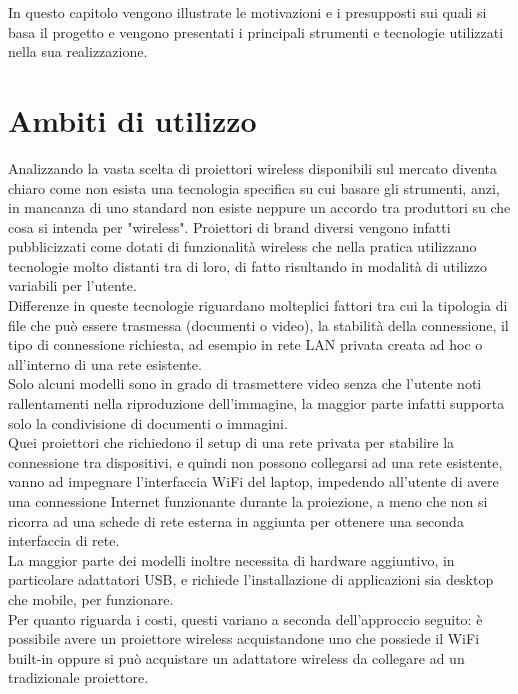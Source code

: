 In questo capitolo vengono illustrate le motivazioni e i presupposti sui quali si basa il progetto e vengono presentati i principali strumenti e tecnologie utilizzati nella sua realizzazione.

\section{Ambiti di utilizzo}

Analizzando la vasta scelta di proiettori wireless disponibili sul mercato diventa chiaro come non esista una tecnologia specifica su cui basare gli strumenti, anzi, in mancanza di uno standard non esiste neppure un accordo tra produttori su che cosa si intenda per "wireless". Proiettori di brand diversi vengono infatti pubblicizzati come dotati di funzionalità wireless che nella pratica utilizzano tecnologie molto distanti tra di loro, di fatto risultando in modalità di utilizzo variabili per l'utente.\\
Differenze in queste tecnologie riguardano molteplici fattori tra cui la tipologia di file che può essere trasmessa (documenti o video), la stabilità della connessione, il tipo di connessione richiesta, ad esempio in rete LAN privata creata ad hoc o all'interno di una rete esistente.\\
Solo alcuni modelli sono in grado di trasmettere video senza che l'utente noti rallentamenti nella riproduzione dell'immagine, la maggior parte infatti supporta solo la condivisione di documenti o immagini. \\ Quei proiettori che richiedono il setup di una rete privata per stabilire la connessione tra dispositivi, e quindi non possono collegarsi ad una rete esistente, vanno ad impegnare l'interfaccia WiFi del laptop, impedendo all'utente di avere una connessione Internet funzionante durante la proiezione, a meno che non si ricorra ad una schede di rete esterna in aggiunta per ottenere una seconda interfaccia di rete.\\
La maggior parte dei modelli inoltre necessita di hardware aggiuntivo, in particolare adattatori USB, e richiede l'installazione di applicazioni sia desktop che mobile, per funzionare.\\
Per quanto riguarda i costi, questi variano a seconda dell'approccio seguito: è possibile avere un proiettore wireless acquistandone uno che possiede il WiFi built-in oppure si può acquistare un adattatore wireless da collegare ad un tradizionale proiettore.\\
